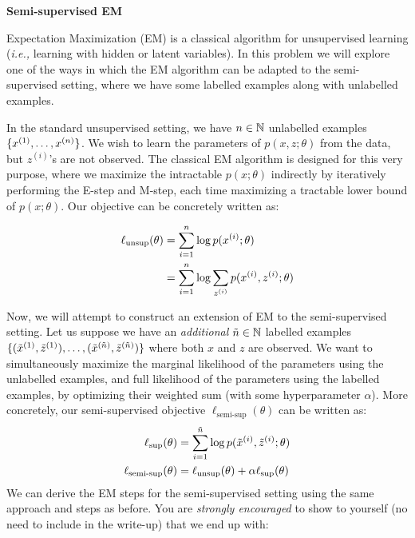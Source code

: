 \item {\bf Semi-supervised EM}

\def\zsi{z^{(i)}}
\def\xsi{x^{(i)}}

Expectation Maximization (EM) is a classical algorithm for unsupervised learning (\emph{i.e.,} learning with hidden or latent variables). In this problem we will explore one of the ways in which the EM algorithm can be adapted to the semi-supervised setting, where we have some labelled examples along with unlabelled examples.

In the standard unsupervised setting, we have ${n} \in \mathbb{N}$ unlabelled examples $\{x^{(1)},\ldots,x^{({n})}\}$. We wish to learn the parameters of $p(x,z;\theta)$ from the data, but $\zsi$'s are not observed. The classical EM algorithm is designed for this very purpose, where we maximize the intractable $p(x;\theta)$ indirectly by iteratively performing the E-step and M-step, each time maximizing a tractable lower bound of $p(x;\theta)$. Our objective can be concretely written as:

\begin{align*}
    \ell_{\text{unsup}}(\theta) &= \sum_{i=1}^\nexp \log p(\xsi;\theta) \\
    &= \sum_{i=1}^\nexp \log \sum_{\zsi} p(\xsi,\zsi;\theta)
\end{align*}


Now, we will attempt to construct an extension of EM to the semi-supervised setting. Let us suppose we have an \emph{additional} $\tilde{{n}} \in \mathbb{N}$ labelled examples $\{(\tilde{x}^{(1)},\tilde{z}^{(1)}),\ldots,(\tilde{x}^{(\tilde{{n}})},\tilde{z}^{(\tilde{{n}})})\}$ where both $x$ and $z$ are observed. We want to simultaneously maximize the marginal likelihood of the parameters using the unlabelled examples, and full likelihood of the parameters using the labelled examples, by optimizing their weighted sum (with some hyperparameter $\alpha$). More concretely, our semi-supervised objective $\ell_\text{semi-sup}(\theta)$ can be written as:
%
\begin{align*}
    \ell_\text{sup}(\theta) &= \sum_{i=1}^{\tilde{{n}}} \log p(\tilde{x}^{(i)},\tilde{z}^{(i)};\theta) \\
    \ell_{\text{semi-sup}}(\theta) &= \ell_\text{unsup}(\theta) + \alpha \ell_\text{sup}(\theta)
\end{align*}
%
We can derive the EM steps for the semi-supervised setting using the same approach and steps as before. You are \emph{strongly encouraged} to show to yourself (no need to include in the write-up) that we end up with:

